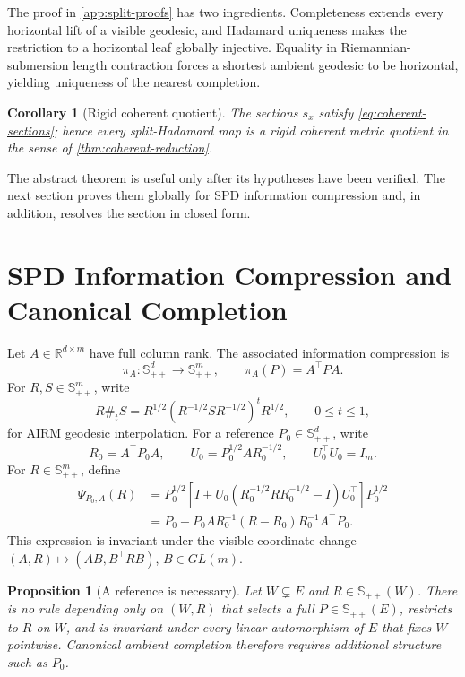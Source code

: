 \documentclass[10pt]{article}
\theoremstyle{plain}
\newtheorem{proposition}[theorem]{Proposition}
\newtheorem{corollary}[theorem]{Corollary}
\theoremstyle{definition}
\theoremstyle{remark}
\newcommand{\R}{\mathbb R}
\newcommand{\SPD}{\mathbb S_{++}}
\begin{document}
The proof in \cref{app:split-proofs} has two ingredients.  Completeness
extends every horizontal lift of a visible geodesic, and Hadamard uniqueness
makes the restriction to a horizontal leaf globally injective.  Equality in
Riemannian-submersion length contraction forces a shortest ambient geodesic
to be horizontal, yielding uniqueness of the nearest completion.

\begin{corollary}[Rigid coherent quotient]
\label{cor:split-coherent}
The sections \(s_x\) satisfy \eqref{eq:coherent-sections}; hence every
split-Hadamard map is a rigid coherent metric quotient in the sense of
\cref{thm:coherent-reduction}.
\end{corollary}

The abstract theorem is useful only after its hypotheses have been verified.
The next section proves them globally for SPD information compression and, in
addition, resolves the section in closed form.

\section{SPD Information Compression and Canonical Completion}
\label{sec:spd-realization}

Let \(A\in\R^{d\times m}\) have full column rank.  The associated information
compression is
\begin{equation}
  \pi_A:\SPD^d\to\SPD^m,
  \qquad
  \pi_A(P)=A^\top P A.
  \label{eq:spd-compression}
\end{equation}
For \(R,S\in\SPD^m\), write
\begin{equation}
  R\#_tS
  =R^{1/2}(R^{-1/2}SR^{-1/2})^tR^{1/2},
  \qquad 0\le t\le1,
  \label{eq:airm-geodesic}
\end{equation}
for AIRM geodesic interpolation.
For a reference \(P_0\in\SPD^d\), write
\[
  R_0=A^\top P_0A,
  \qquad
  U_0=P_0^{1/2}AR_0^{-1/2},
  \qquad U_0^\top U_0=I_m.
\]
For \(R\in\SPD^m\), define
\begin{align}
  \Psi_{P_0,A}(R)
  &=P_0^{1/2}
  \left[I+U_0(R_0^{-1/2}RR_0^{-1/2}-I)U_0^\top\right]
  P_0^{1/2}
  \nonumber\\
  &=P_0+P_0AR_0^{-1}(R-R_0)R_0^{-1}A^\top P_0.
  \label{eq:canonical-completion}
\end{align}
This expression is invariant under the visible coordinate change
\((A,R)\mapsto(AB,B^\top RB)\), \(B\in GL(m)\).

\begin{proposition}[A reference is necessary]
\label{prop:reference-necessary}
Let \(W\subsetneq E\) and \(R\in\SPD(W)\).  There is no rule depending only
on \((W,R)\) that selects a full \(P\in\SPD(E)\), restricts to \(R\) on
\(W\), and is invariant under every linear automorphism of \(E\) that fixes
\(W\) pointwise.  Canonical ambient completion therefore requires additional
structure such as \(P_0\).
\end{proposition}
\end{document}
